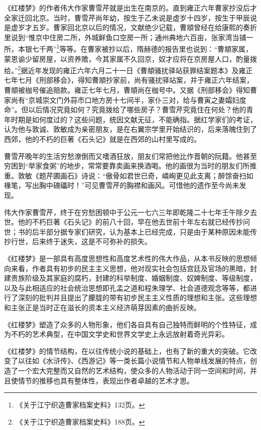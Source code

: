 \par 《红楼梦》的作者伟大作家曹雪芹就是出生在南京的。直到雍正六年曹家抄没后才全家迁回北京。当时，曹雪芹尚年幼，按生于乙未说是虚岁十四岁，按生于甲辰说是虚岁才五岁。曹家回北京以后的情况，文献绝少记载，曹頫曾经在给康熙的奏折里说到“惟京中住房二所，外城鲜鱼口空房一所；通州典地六百亩，张家湾当铺一所，本银七千两”\footnote{《关于江宁织造曹家档案史料》132页。}等等。在曹家被抄以后，隋赫德的报告里也说到：“曹頫家属，蒙恩谕少留房屋，以资养赡，今其家属不久回京，奴才应将在京房屋人口，酌量拨给。”\footnote{《关于江宁织造曹家档案史料》188页。}据近年发现的雍正六年六月二十一日《曹頫骚扰驿站获罪结案题本》及雍正七年七月《刑部移会》，得知曹頫抄家前，尚有骚扰驿站案，并于雍正六年结案，曹頫被枷号催追赔款。雍正七年七月，曹頫尚在枷号中。又据《刑部移会》得知曹家尚有“京城崇文门外蒜市口地方房十七间半，家仆三对，给与曹寅之妻孀妇度命”。但以后情况究竟如何？究竟拨给了哪些房子？曹雪芹究竟住在何处？他的青年时期是如何度过的？这些问题，统因文献无征，不能确指。据红学家们的考证，认为他与敦诚、敦敏成为亲密朋友，是在右翼宗学里开始结识的，后来落魄住到了西郊，他的不朽的巨著《石头记》就是在西郊的山村里写成的。
\par 曹雪芹晚年的生活穷愁潦倒而又嗜酒狂放，朋友们常把他比作晋朝的阮籍。他甚至穷困到“举家食粥”的地步，常常要靠卖画来换酒喝。他的画很为当时的朋友们所推重。敦敏《题芹圃画石》诗说：“傲骨如君世已奇，嶙峋更见此支离；醉馀奋扫如椽笔，写出胸中磈礧时！”可见曹雪芹的胸襟和画风。可惜他的遗作至今尚未发现。
\par 伟大作家曹雪芹，终于在穷愁困顿中于公元一七六三年即乾隆二十七年壬午除夕去世。他的不朽巨著《石头记》的前八十回，早在他去世前十年左右就已经传抄问世；书的后半部分据专家们研究，认为基本上已经完成，只是由于某种原因未能传抄行世，后来终于迷失，这是不可弥补的损失。
\par 《红楼梦》是一部具有高度思想性和高度艺术性的伟大作品，从本书反映的思想倾向来看，作者具有初步的民主主义思想，他对现实社会包括宫廷及官场的黑暗，封建贵族阶级及其家庭的腐朽，封建的科举制度、婚姻制度、奴婢制度、等级制度，以及与此相适应的社会统治思想即孔孟之道和程朱理学、社会道德观念等等，都进行了深刻的批判并且提出了朦胧的带有初步民主主义性质的理想和主张。这些理想和主张正是当时正在滋长的资本主义经济萌芽因素的曲折反映。
\par 《红楼梦》塑造了众多的人物形象，他们各自具有自己独特而鲜明的个性特征，成为不朽的艺术典型，在中国文学史和世界文学史上永远放射着奇光异彩。
\par 《红楼梦》的情节结构，在以往传统小说的基础上，也有了新的重大的突破。它改变了以往如《水浒传》、《西游记》等一类长篇小说情节和人物单线发展的特点，创造了一个宏大完整而又自然的艺术结构，使众多的人物活动于同一空间和时间，并且使情节的推移也具有整体性，表现出作者卓越的艺术才思。
